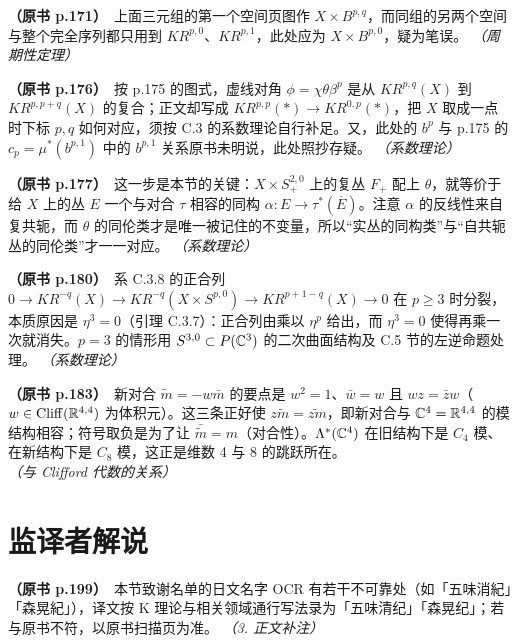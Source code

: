 \noindent \textbf{（原书 p.171）}\ 上面三元组的第一个空间页图作 $X\times B^{p,q}$，而同组的另两个空间与整个完全序列都只用到 $KR^{p,0}$、$KR^{p,1}$，此处应为 $X\times B^{p,0}$，疑为笔误。 \textit{（周期性定理）}\par\smallskip

\noindent \textbf{（原书 p.176）}\ 按 p.175 的图式，虚线对角 $\phi=\chi\theta\beta^p$ 是从 $KR^{p,q}(X)$ 到 $KR^{p,p+q}(X)$ 的复合；正文却写成 $KR^{p,p}(*)\to KR^{0,p}(*)$，把 $X$ 取成一点时下标 $p,q$ 如何对应，须按 C.3 的系数理论自行补足。又，此处的 $b^p$ 与 p.175 的 $c_p=\mu^*(b^{p,1})$ 中的 $b^{p,1}$ 关系原书未明说，此处照抄存疑。 \textit{（系数理论）}\par\smallskip

\noindent \textbf{（原书 p.177）}\ 这一步是本节的关键：$X\times S^{2,0}_+$ 上的复丛 $F_+$ 配上 $\theta$，就等价于给 $X$ 上的丛 $E$ 一个与对合 $\tau$ 相容的同构 $\alpha\colon E\to\tau^*(\overline{E})$。注意 $\alpha$ 的反线性来自复共轭，而 $\theta$ 的同伦类才是唯一被记住的不变量，所以“实丛的同构类”与“自共轭丛的同伦类”才一一对应。 \textit{（系数理论）}\par\smallskip

\noindent \textbf{（原书 p.180）}\ 系 C.3.8 的正合列 $0\to KR^{-q}(X)\to KR^{-q}(X\times S^{p,0})\to KR^{p+1-q}(X)\to 0$ 在 $p\ge3$ 时分裂，本质原因是 $\eta^3=0$（引理 C.3.7）：正合列由乘以 $\eta^p$ 给出，而 $\eta^3=0$ 使得再乘一次就消失。$p=3$ 的情形用 $S^{3,0}\subset P(\mathbb{C}^3)$ 的二次曲面结构及 C.5 节的左逆命题处理。 \textit{（系数理论）}\par\smallskip

\noindent \textbf{（原书 p.183）}\ 新对合 $\tilde m=-w\bar m$ 的要点是 $w^2=1$、$\bar w=w$ 且 $wz=\bar zw$（$w\in\operatorname{Cliff}(\mathbb{R}^{4,4})$ 为体积元）。这三条正好使 $z\tilde m=\widetilde{zm}$，即新对合与 $\mathbb{C}^4=\mathbb{R}^{4,4}$ 的模结构相容；符号取负是为了让 $\bar{\tilde m}=m$（对合性）。$\Lambda^*(\mathbb{C}^4)$ 在旧结构下是 $C_4$ 模、在新结构下是 $C_8$ 模，这正是维数 4 与 8 的跳跃所在。 \textit{（与 Clifford 代数的关系）}\par\smallskip

\section*{监译者解说}

\noindent \textbf{（原书 p.199）}\ 本节致谢名单的日文名字 OCR 有若干不可靠处（如「五味消紀」「森晃紀」），译文按 K 理论与相关领域通行写法录为「五味清纪」「森晃纪」；若与原书不符，以原书扫描页为准。 \textit{（3. 正文补注）}\par\smallskip
